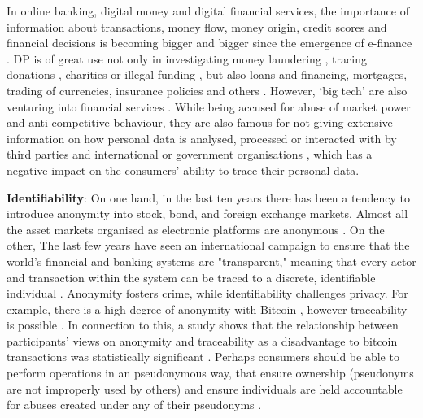 In online banking, digital money and digital financial services, the importance of information about transactions, money flow, money origin, credit scores and financial decisions is becoming bigger and bigger since the emergence of e-finance \cite{e_finance_importance}. DP is of great use  not only in investigating money laundering \cite{money_laundering}, tracing donations \cite{finance_4}, charities \cite{finance_1} or illegal funding \cite{illegal_funding}, but also loans and financing, mortgages, trading of currencies, insurance policies and others \cite{finance_whats_next}. However, ‘big tech’ are also venturing into financial services \cite{big_tech_in_finance}. While being accused for abuse of market power and anti-competitive behaviour, they are also famous for not giving extensive information on how personal data is analysed, processed or interacted with by third parties and international or government organisations \cite[RV19]{big_tech_bad}, which has a negative impact on the consumers' ability to trace their personal data. \newline


\textbf{Identifiability}: On one hand, in the last ten years there has been a tendency to introduce anonymity into stock, bond, and foreign exchange markets. Almost all the asset markets organised as electronic platforms are anonymous \cite{aliprantis2007anonymous}. On the other, The last few years have seen an international campaign to ensure that the world's financial and banking systems are "transparent," meaning that every actor and transaction within the system can be traced to a discrete, identifiable individual \cite{sharman2010shopping}. Anonymity fosters crime, while identifiability challenges privacy. For example, there is a high degree of anonymity with Bitcoin \cite{bitcoin}, however traceability is possible \cite{bitcoin_anonymity}. In connection to this, a study shows that the relationship between participants’ views on anonymity and traceability as a disadvantage to bitcoin transactions was statistically significant \cite{bitcoin_anonymity_study}. Perhaps consumers should be able to perform operations in an pseudonymous way, that ensure ownership (pseudonyms are not improperly used by others) and ensure individuals are held accountable for abuses created under any of their pseudonyms \cite{req_f2}. \newline

